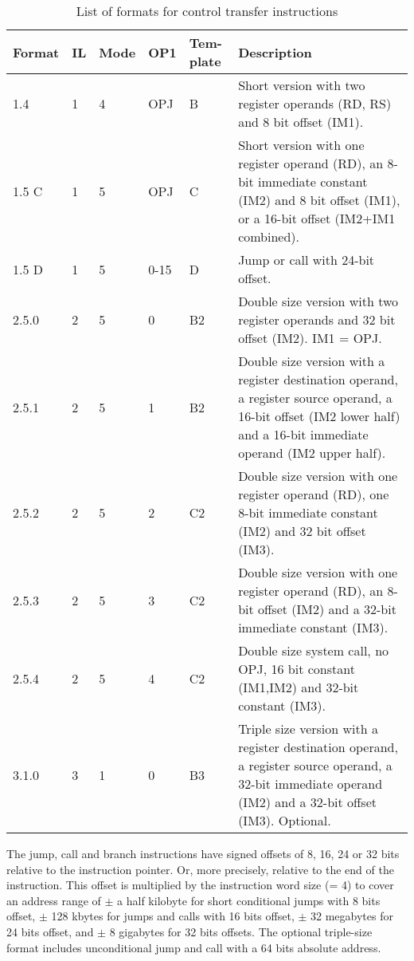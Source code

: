 \documentclass[forwardcom.tex]{subfiles}
\begin{document}
\begin{longtable}
{|p{10mm}|p{8mm}|p{8mm}|p{8mm}|p{8mm}|p{70mm}|}
\caption{List of formats for control transfer instructions}
\label{table:jumpInstructionFormats}
\endfirsthead
\endhead
\hline
Format & IL & Mode & OP1 & Tem-plate & Description \\
\hline
1.4 & 1 & 4 & OPJ & B & Short version with two register operands (RD, RS) and 8 bit offset  (IM1).  \\
\hline
1.5 C & 1 & 5 & OPJ & C & Short version with one register operand (RD), an 8-bit immediate constant (IM2) and 8 bit offset (IM1), or a 16-bit offset (IM2+IM1 combined). \\
\hline
1.5 D & 1 & 5 & 0-15 & D & Jump or call with 24-bit offset. \\
\hline
2.5.0 & 2 & 5 & 0 & B2 & Double size version with two register operands and 32 bit offset  (IM2). IM1 = OPJ. \\
\hline
2.5.1 & 2 & 5 & 1 & B2 & Double size version with a register destination operand, a register source operand, a 16-bit offset (IM2 lower half) and a 16-bit immediate operand (IM2 upper half).  \\
\hline
2.5.2 & 2 & 5 & 2 & C2 & Double size version with one register operand (RD), one 8-bit immediate constant (IM2) and 32 bit offset (IM3). \\
\hline
2.5.3 & 2 & 5 & 3 & C2 & Double size version with one register operand (RD), an 8-bit offset (IM2) and a 32-bit immediate constant (IM3).  \\
\hline
2.5.4 & 2 & 5 & 4 & C2 & Double size system call, no OPJ, 16 bit constant (IM1,IM2) and 32-bit constant (IM3). \\
\hline
3.1.0 & 3 & 1 & 0 & B3 & Triple size version with a register destination operand, a register source operand, a 32-bit immediate operand (IM2) and a 32-bit offset (IM3). Optional.  \\
\hline
\end{longtable}

The jump, call and branch instructions have signed offsets of 8, 16, 24 or 32 bits relative to the instruction pointer. Or, more precisely, relative to the end of the instruction. This offset is multiplied by the instruction word size (= 4) to cover an address range of $\pm$ a half kilobyte for short conditional jumps with 8 bits offset, $\pm$ 128 kbytes for jumps and calls with 16 bits offset, $\pm$ 32 megabytes for 24 bits offset, and $\pm$ 8 gigabytes for 32 bits offsets. The optional triple-size format includes unconditional jump and call with a 64 bits absolute address.
\vspace{2mm}
\end{document}
